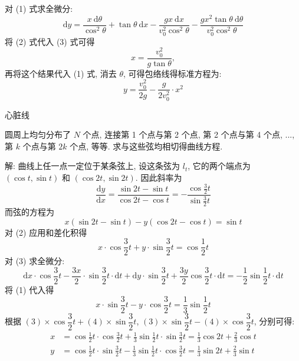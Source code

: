 对 (1) 式求全微分:
\[ \mathrm{d}y = \frac{x\ \mathrm{d}\theta}{\cos^2\theta} + \tan\theta\ \mathrm{d}x - \frac{gx\ \mathrm{d}x}{v_0^2\cos^2\theta} - \frac{gx^2\tan\theta\ \mathrm{d}\theta}{v_0^2\cos^2\theta} \tag{3} \]
将 (2) 式代入 (3) 式可得 
\[ x = \frac{v_0^2}{g\tan\theta} ,\]
再将这个结果代入 (1) 式, 消去 $\theta$, 可得包络线得标准方程为:
\[ y = \frac{v_0^2}{2g} - \frac{g}{2v_0^2} \cdot x^2 \]



\newpage

\noindent 心脏线

圆周上均匀分布了 $N$ 个点, 连接第 1 个点与第 2 个点, 第 2 个点与第 4 个点, ..., 第 $k$ 个点与第 $2k$ 个点, 等等. 求与这些弦均相切得曲线方程.
\begin{figure*}[htbp]
\centering
{}
\end{figure*}

解: 曲线上任一点一定位于某条弦上, 设这条弦为 $l_t$, 它的两个端点为 $(\cos t, \sin t)$ 和 $(\cos 2t, \sin 2t)$. 因此斜率为
\[ \frac{\mathrm{d}y}{\mathrm{d}x} = \frac{\sin 2t - \sin t}{\cos 2t - \cos t} = -\frac{\cos\frac{3}{2}t}{\sin\frac{3}{2}t} \tag{1}\]
而弦的方程为
\[ x(\sin 2t - \sin t) - y(\cos 2t - \cos t) = \sin t \tag{2} \]
对 (2) 应用和差化积得
\[ x\cdot\cos\frac{3}{2}t + y\cdot\sin\frac{3}{2}t = \cos\frac{1}{2}t \tag{3} \]
对 (3) 求全微分:
\[ \mathrm{d}x\cdot\cos\frac{3}{2}t -\frac{3x}{2}\cdot\sin\frac{3}{2}t\cdot \mathrm{d}t + \mathrm{d}y\cdot\sin\frac{3}{2}t + \frac{3y}{2}\cos\frac{3}{2}t\cdot \mathrm{d}t = -\frac{1}{2}\sin\frac{1}{2}t\cdot\mathrm{d}t \]
将 (1) 代入得
\[ x\cdot\sin\frac{3}{2}t - y\cdot\cos\frac{3}{2}t = \frac{1}{3}\sin\frac{1}{2}t \tag{4} \]
根据 $(3)\times \cos\dfrac{3}{2}t+(4)\times \sin\dfrac{3}{2}t$, $(3)\times \sin\dfrac{3}{2}t-(4)\times \cos\dfrac{3}{2}t$, 分别可得:
\begin{align*}
x &= \cos\frac{1}{2}t\cdot\cos\frac{3}{2}t + \frac{1}{3}\sin\frac{1}{2}t\cdot\sin\frac{3}{2}t = \frac{1}{3}\cos 2t + \frac{2}{3}\cos t \\
y &= \cos\frac{1}{2}t\cdot\sin\frac{3}{2}t - \frac{1}{3}\sin\frac{1}{2}t\cdot\cos\frac{3}{2}t = \frac{1}{3}\sin 2t + \frac{2}{3}\sin t
\end{align*}

